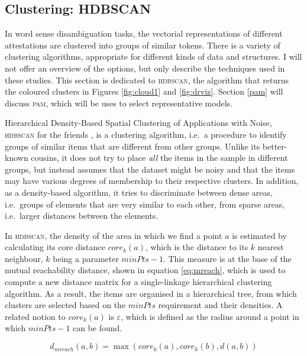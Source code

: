 \documentclass[
]{book}
\begin{document}
\hypertarget{hdbscan}{%
\subsection{Clustering: HDBSCAN}\label{hdbscan}}

In word sense disambiguation tasks, the vectorial representations of different attestations are clustered into groups of similar tokens. There is a variety of clustering algorithms, appropriate for different kinds of data and structures. I will not offer an overview of the options, but only describe the techniques used in these studies. This section is dedicated to \textsc{hdbscan}, the algorithm that returns the coloured clusters in Figures \ref{fig:cloud1} and \ref{fig:drviz}. Section \ref{pam} will discuss \textsc{pam}, which will be uses to select representative models.

Hierarchical Density-Based Spatial Clustering of Applications with Noise, \textsc{hdbscan} for the friends \autocite{campello.etal_2013}, is a clustering algorithm, i.e.~a procedure to identify groups of similar items that are different from other groups. Unlike its better-known cousins, it does not try to place \emph{all} the items in the sample in different groups, but instead assumes that the dataset might be noisy and that the items may have various degrees of membership to their respective clusters. In addition, as a density-based algorithm, it tries to discriminate between dense areas, i.e.~groups of elements that are very similar to each other, from sparse areas, i.e.~larger distances between the elements.

In \textsc{hdbscan}, the density of the area in which we find a point \(a\) is estimated by calculating its
core distance \(core_{k}(a)\), which is the distance to its \(k\) nearest neighbour, \(k\) being a parameter \(minPts - 1\).
This measure is at the base of the mutual reachability distance, shown in equation \eqref{eq:mreach}, which is used to compute a new distance matrix for a single-linkage hierarchical clustering algorithm. As a result, the items are organised in a hierarchical tree, from which clusters are selected based on the \(minPts\) requirement and their densities. A related notion to \(core_k(a)\) is \(\varepsilon\), which is defined as the radius around a point in which \(minPts - 1\) can be found.

\begin{equation}
    d_{mreach}(a,b) = \max(core_{k}(a), core_{k}(b), d(a,b))
    \label{eq:mreach}
\end{equation}
\end{document}
